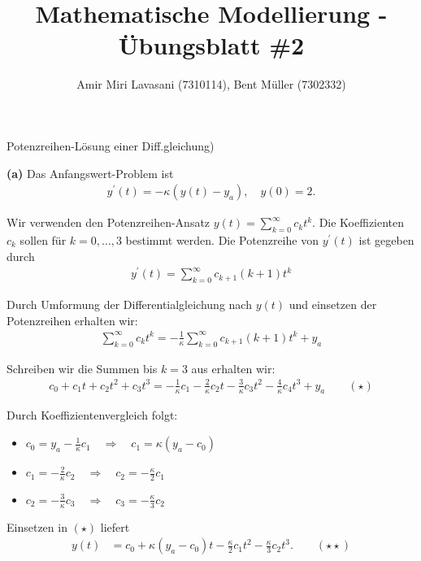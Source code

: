 \documentclass[a4paper]{article}
\newenvironment{Aufgabe}[2][Aufgabe]{\begin{trivlist}
\item[\hskip \labelsep {\bfseries #1}\hskip \labelsep {\bfseries #2.}]}{\end{trivlist}}
\begin{document}
 
\title{ \textbf{Mathematische Modellierung - Übungsblatt \#2} }

\author{Amir Miri Lavasani (7310114), Bent Müller (7302332)} \maketitle

 
\begin{Aufgabe}{4}
    (Potenzreihen-Lösung einer Diff.gleichung)
\end{Aufgabe}

\textbf{(a)} Das Anfangswert-Problem ist 
  \begin{align*}
    y^\prime(t) = -\kappa(y(t) - y_a), \quad y(0) = 2.
  \end{align*}
  
  Wir verwenden den Potenzreihen-Ansatz $y(t) = \sum_{k=0}^{\infty} c_k t^k$. Die Koeffizienten $c_k$ sollen 
  für $k=0,\dots,3$ bestimmt werden. Die Potenzreihe von $y^\prime(t)$ ist gegeben durch 
  \begin{align*}
    y^\prime(t) = \sum_{k=0}^{\infty} c_{k+1}(k+1) t^k
  \end{align*}

  Durch Umformung der Differentialgleichung nach $y(t)$ und einsetzen der Potenzreihen erhalten wir:
  \begin{align*}
    \sum_{k=0}^{\infty} c_k t^k = -\frac{1}{\kappa} \sum_{k=0}^{\infty} c_{k+1}(k+1) t^k + y_a
  \end{align*}

  Schreiben wir die Summen bis $k=3$ aus erhalten wir:
  \begin{align*}
    c_0 + c_1t + c_2t^2 + c_3t^3 = -\frac{1}{\kappa}c_1 - \frac{2}{\kappa}c_2t 
                                   - \frac{3}{\kappa}c_3t^2 - \frac{4}{\kappa}c_4t^3 + y_a  \qquad(\star)
  \end{align*}

  Durch Koeffizientenvergleich folgt:
  \begin{itemize}
    \item[-] $c_0 = y_a - \frac{1}{\kappa}c_1 \quad\Rightarrow\quad c_1 = \kappa(y_a - c_0)$
    \item[-] $c_1 = -\frac{2}{\kappa}c_2 \quad\Rightarrow\quad c_2 = -\frac{\kappa}{2} c_1$
    \item[-] $c_2 = -\frac{3}{\kappa} c_3 \quad\Rightarrow\quad c_3 = -\frac{\kappa}{3}c_2$ 
  \end{itemize}

  Einsetzen in $(\star)$ liefert
  \begin{align*}
    y(t) &= c_0 + \kappa(y_a - c_0) t - \frac{\kappa}{2} c_1 t^2 - \frac{\kappa}{3}c_2 t^3. \qquad (\star\star) \\
  \end{align*}
\end{document}
